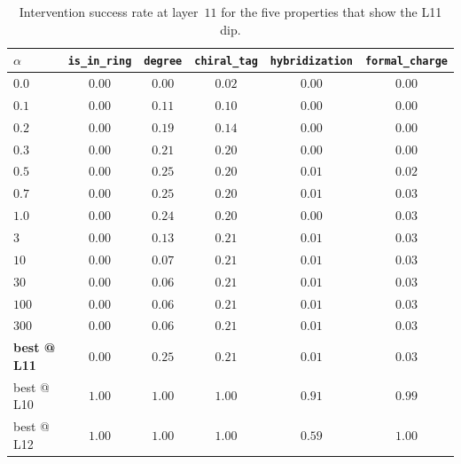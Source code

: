 \begin{table}[h]
\centering
\small
\begin{tabular}{lccccc}
\toprule
$\alpha$ & \texttt{is\_in\_ring} & \texttt{degree} & \texttt{chiral\_tag} & \texttt{hybridization} & \texttt{formal\_charge} \\
\midrule
$0.0$ & $0.00$ & $0.00$ & $0.02$ & $0.00$ & $0.00$ \\
$0.1$ & $0.00$ & $0.11$ & $0.10$ & $0.00$ & $0.00$ \\
$0.2$ & $0.00$ & $0.19$ & $0.14$ & $0.00$ & $0.00$ \\
$0.3$ & $0.00$ & $0.21$ & $0.20$ & $0.00$ & $0.00$ \\
$0.5$ & $0.00$ & $0.25$ & $0.20$ & $0.01$ & $0.02$ \\
$0.7$ & $0.00$ & $0.25$ & $0.20$ & $0.01$ & $0.03$ \\
$1.0$ & $0.00$ & $0.24$ & $0.20$ & $0.00$ & $0.03$ \\
$3$ & $0.00$ & $0.13$ & $0.21$ & $0.01$ & $0.03$ \\
$10$ & $0.00$ & $0.07$ & $0.21$ & $0.01$ & $0.03$ \\
$30$ & $0.00$ & $0.06$ & $0.21$ & $0.01$ & $0.03$ \\
$100$ & $0.00$ & $0.06$ & $0.21$ & $0.01$ & $0.03$ \\
$300$ & $0.00$ & $0.06$ & $0.21$ & $0.01$ & $0.03$ \\
\midrule
\textbf{best @ L11} & $\mathbf{0.00}$ & $\mathbf{0.25}$ & $\mathbf{0.21}$ & $\mathbf{0.01}$ & $\mathbf{0.03}$ \\
best @ L10 & $1.00$ & $1.00$ & $1.00$ & $0.91$ & $0.99$ \\
best @ L12 & $1.00$ & $1.00$ & $1.00$ & $0.59$ & $1.00$ \\
\bottomrule
\end{tabular}
\caption{Intervention success rate at \smi layer~$11$ for the five properties that show the L11 dip.}
\label{app:l11-table}
\end{table}
